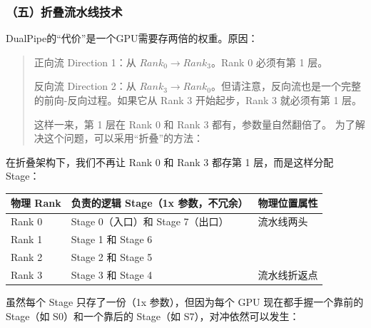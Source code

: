 \hypertarget{ux4e94ux6298ux53e0ux6d41ux6c34ux7ebfux6280ux672f}{%
\subsubsection{（五）折叠流水线技术}\label{ux4e94ux6298ux53e0ux6d41ux6c34ux7ebfux6280ux672f}}

DualPipe的``代价''是一个GPU需要存两倍的权重。原因：

\begin{quote}
正向流 Direction 1：从 \(Rank_0 \rightarrow Rank_3\)。Rank 0 必须有第 1 层。

反向流 Direction 2：从 \(Rank_3 \rightarrow Rank_0\)。但请注意，反向流也是一个完整的前向-反向过程。如果它从 Rank 3 开始起步，Rank 3 就必须有第 1 层。

这样一来，第 1 层在 Rank 0 和 Rank 3 都有，参数量自然翻倍了。
为了解决这个问题，可以采用``折叠''的方法：
\end{quote}

在折叠架构下，我们不再让 Rank 0 和 Rank 3 都存第 1 层，而是这样分配 Stage：

\begin{longtable}[]{@{}
  >{\raggedright\arraybackslash}p{}
  >{\raggedright\arraybackslash}p{}
  >{\raggedright\arraybackslash}p{}@{}}
\toprule
物理 Rank & 负责的逻辑 Stage（1x 参数，不冗余） & 物理位置属性 \\
\midrule
\endhead
Rank 0 & Stage 0（入口）和 Stage 7（出口） & 流水线两头 \\
Rank 1 & Stage 1 和 Stage 6 & \\
Rank 2 & Stage 2 和 Stage 5 & \\
Rank 3 & Stage 3 和 Stage 4 & 流水线折返点 \\
\bottomrule
\end{longtable}

虽然每个 Stage 只存了一份（1x 参数），但因为每个 GPU 现在都手握一个靠前的 Stage（如 S0）和一个靠后的 Stage（如 S7），对冲依然可以发生：

